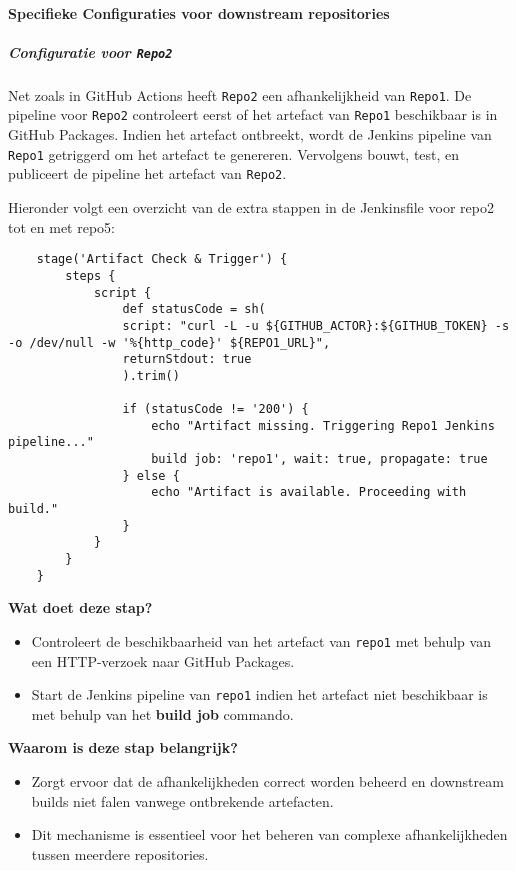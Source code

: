 \paragraph{Specifieke Configuraties voor downstream repositories}

\subparagraph{Configuratie voor \texttt{Repo2}}
Net zoals in GitHub Actions heeft \texttt{Repo2} een afhankelijkheid van \texttt{Repo1}. De pipeline voor \texttt{Repo2} controleert eerst of het artefact van \texttt{Repo1} beschikbaar is in GitHub Packages. Indien het artefact ontbreekt, wordt de Jenkins pipeline van \texttt{Repo1} getriggerd om het artefact te genereren. Vervolgens bouwt, test, en publiceert de pipeline het artefact van \texttt{Repo2}. 

Hieronder volgt een overzicht van de extra stappen in de Jenkinsfile voor repo2 tot en met repo5:

\begin{verbatim}
    stage('Artifact Check & Trigger') {
        steps {
            script {
                def statusCode = sh(
                script: "curl -L -u ${GITHUB_ACTOR}:${GITHUB_TOKEN} -s -o /dev/null -w '%{http_code}' ${REPO1_URL}",
                returnStdout: true
                ).trim()
                
                if (statusCode != '200') {
                    echo "Artifact missing. Triggering Repo1 Jenkins pipeline..."
                    build job: 'repo1', wait: true, propagate: true
                } else {
                    echo "Artifact is available. Proceeding with build."
                }
            }
        }
    }
\end{verbatim}

\textbf{Wat doet deze stap?}
\begin{itemize}
    \item Controleert de beschikbaarheid van het artefact van \texttt{repo1} met behulp van een HTTP-verzoek naar GitHub Packages.
    \item Start de Jenkins pipeline van \texttt{repo1} indien het artefact niet beschikbaar is met behulp van het \textbf{build job} commando.
\end{itemize}

\textbf{Waarom is deze stap belangrijk?}
\begin{itemize}
    \item Zorgt ervoor dat de afhankelijkheden correct worden beheerd en downstream builds niet falen vanwege ontbrekende artefacten.
    \item Dit mechanisme is essentieel voor het beheren van complexe afhankelijkheden tussen meerdere repositories.
\end{itemize}

